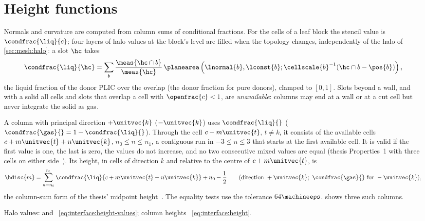 \section{Height functions}\label{sec:interface:heights}
Normals and curvature are computed from column sums of conditional fractions.
For the cells of a leaf block the stencil value is $\condfrac{\liq}{c}$; four
layers of halo values at the block's level are filled when the topology
changes, independently of the halo of \cref{sec:mesh:halo}: a slot $\hc$ takes
\begin{equation}\label{eq:interface:height-values}
  \condfrac{\liq}{\hc}=\sum_{b}\frac{\meas{\hc\cap b}}{\meas{\hc}}\,
    \planearea\roundpar{\lnormal{b},\lconst{b};\cellscale{b}^{-1}(\hc\cap b-\pos{b})},
\end{equation}
the liquid fraction of the donor PLIC over the overlap (the donor fraction for
pure donors), clamped to $[0,1]$. Slots beyond a wall, and with a solid all
cells and slots that overlap a cell with $\openfrac{c}<1$, are
\emph{unavailable}: columns may end at a wall or at a cut cell but never
integrate the solid as gas.

A column with principal direction $+\unitvec{k}$ ($-\unitvec{k}$) uses
$\condfrac{\liq}{}$ ($\condfrac{\gas}{}=1-\condfrac{\liq}{}$). Through the cell
$c+m\unitvec{t}$, $t\neq k$, it consists of the available cells
$c+m\unitvec{t}+n\unitvec{k}$, $n_0\le n\le n_1$, a contiguous run in
$-3\le n\le3$ that starts at the first available cell. It is valid if the
first value is one, the last is zero, the values do not increase, and no two
consecutive mixed values are equal (thesis Properties~1 with three cells on either side~). Its height, in cells of direction $k$ and relative
to the centre of $c+m\unitvec{t}$, is
\begin{equation}\label{eq:interface:height}
  \hdisc{m}=\sum_{n=n_0}^{n_1}\condfrac{\liq}{c+m\unitvec{t}+n\unitvec{k}}+n_0-\half
  \qquad(\text{direction }+\unitvec{k};\ \condfrac{\gas}{}\text{ for }-\unitvec{k}),
\end{equation}
the column-sum form of the thesis' midpoint height~. The
equality tests use the tolerance $64\machineeps$.
 shows three such columns.



\begin{implnote}
Halo values:  and
~\cref{eq:interface:height-values};
column heights ~\cref{eq:interface:height}.
\end{implnote}

